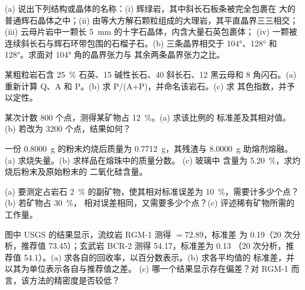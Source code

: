 \begin{exercise}[$\star$]\label{exo:b2:field-lab-methods-2:1}
(a) 说出下列结构或晶体的名称：(i) 辉绿岩，其中斜长石板条被完全包裹在
大的普通辉石晶体之中；(ii) 由等大方解石颗粒组成的大理岩，其平直晶界三三相交；
(iii) 云母片岩中一颗长 \qty{5}{mm} 的十字石晶体，内含大量石英包裹体；
(iv) 一颗被连续斜长石与辉石环带包围的石榴子石。(b) 三条晶界相交于
\ang{104}、\ang{128} 和 \ang{128}。求面对 \ang{104} 角的晶界张力与
其余两条晶界张力之比。
\end{exercise}

\begin{exercise}[$\star$]\label{exo:b2:field-lab-methods-2:2}
某粗粒岩石含 \qty{25}{\percent} 石英、15 碱性长石、40 斜长石、12
黑云母和 8 角闪石。(a) 重新计算 Q、A 和 P。(b) 求 P/(A+P)，并命名该岩石。(c) 求
其色指数，并予以定性。
\end{exercise}

\begin{exercise}[$\star$]\label{exo:b2:field-lab-methods-2:3}
某次计数 800 个点，测得某矿物占 \qty{12}{\percent}。(a) 求该比例的
标准差及其相对值。(b) 若改为 3200 个点，结果如何？
\end{exercise}

\begin{exercise}[$\star$]\label{exo:b2:field-lab-methods-2:4}
一份 \qty{0.8000}{g} 的粉末灼烧后质量为 \qty{0.7712}{g}，其残渣与
\qty{8.0000}{g} 助熔剂熔融。(a) 求烧失量。(b) 求样品在熔珠中的质量分数。
(c) 玻璃中  含量为 \qty{5.20}{\percent}，求灼烧后粉末及原始粉末的
二氧化硅含量。
\end{exercise}

\begin{exercise}[$\star\star$]\label{exo:b2:field-lab-methods-2:5}
(a) 要测定占岩石 \qty{2}{\percent} 的副矿物，使其相对标准误差为
\qty{10}{\percent}，需要计多少个点？(b) 若矿物占 \qty{30}{\percent}，
相对误差相同，又需要多少个点？(c) 评述稀有矿物所需的工作量。
\end{exercise}

\begin{exercise}[$\star\star$]\label{exo:b2:field-lab-methods-2:6}
图中 USGS 的结果显示，流纹岩 RGM-1 测得  $= 72.89$，标准差
为 0.19（20 次分析，推荐值 73.45）；玄武岩 BCR-2 测得 54.17，标准差为 0.13
（20 次分析，推荐值 54.1）。(a) 求各自的回收率，以百分数表示。(b) 求各平均值的
标准差，并以其为单位表示各自与推荐值之差。
(c) 哪一个结果显示存在偏差？对 RGM-1 而言，该方法的精密度是否较低？
\end{exercise}

